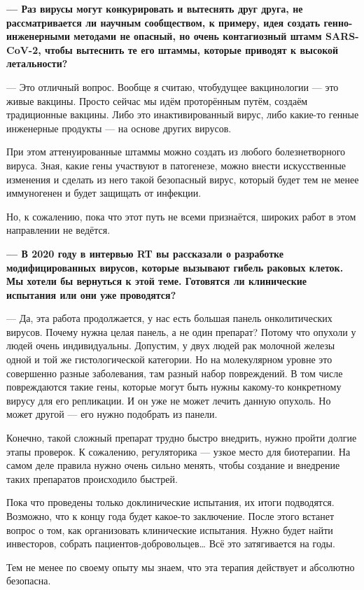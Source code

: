 {\bf — Раз вирусы могут конкурировать и вытеснять друг друга, не рассматривается ли научным сообществом, к примеру, идея создать генно-инженерными методами не опасный, но очень контагиозный штамм SARS-CoV-2, чтобы вытеснить те его штаммы, которые приводят к высокой летальности? }

— Это отличный вопрос. Вообще я считаю, чтобудущее вакцинологии — это живые вакцины. Просто сейчас мы идём проторённым путём, создаём традиционные вакцины. Либо это инактивированный вирус, либо какие-то генные инженерные продукты — на основе других вирусов.

При этом аттенуированные штаммы можно создать из любого болезнетворного вируса. Зная, какие гены участвуют в патогенезе, можно внести искусственные изменения и сделать из него такой безопасный вирус, который будет тем не менее иммуногенен и будет защищать от инфекции.

Но, к сожалению, пока что этот путь не всеми признаётся, широких работ в этом направлении не ведётся.

{\bf — В 2020 году в интервью RT вы рассказали о разработке модифицированных вирусов, которые вызывают гибель раковых клеток. Мы хотели бы вернуться к этой теме. Готовятся ли клинические испытания или они уже проводятся? }

— Да, эта работа продолжается, у нас есть большая панель онколитических вирусов. Почему нужна целая панель, а не один препарат? Потому что опухоли у людей очень индивидуальны. Допустим, у двух людей рак молочной железы одной и той же гистологической категории. Но на молекулярном уровне это совершенно разные заболевания, там разный набор повреждений. В том числе повреждаются такие гены, которые могут быть нужны какому-то конкретному вирусу для его репликации. И он уже не может лечить данную опухоль. Но может другой — его нужно подобрать из панели.

Конечно, такой сложный препарат трудно быстро внедрить, нужно пройти долгие этапы проверок. К сожалению, регуляторика — узкое место для биотерапии. На самом деле правила нужно очень сильно менять, чтобы создание и внедрение таких препаратов происходило быстрей.

Пока что проведены только доклинические испытания, их итоги подводятся. Возможно, что к концу года будет какое-то заключение. После этого встанет вопрос о том, как организовать клинические испытания. Нужно будет найти инвесторов, собрать пациентов-добровольцев… Всё это затягивается на годы.

Тем не менее по своему опыту мы знаем, что эта терапия действует и абсолютно безопасна.

